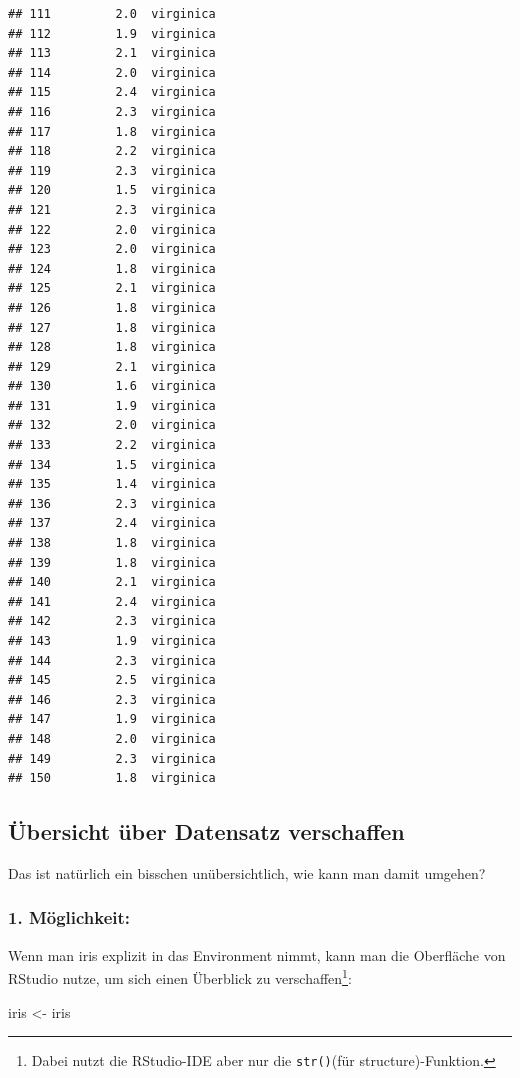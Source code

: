 \documentclass[
]{book}
\newenvironment{Shaded}{\begin{snugshade}}{\end{snugshade}}
\newcommand{\NormalTok}[1]{#1}
\newcommand{\OtherTok}[1]{\textcolor[rgb]{0.56,0.35,0.01}{#1}}
\begin{document}
\begin{verbatim}
## 111         2.0  virginica
## 112         1.9  virginica
## 113         2.1  virginica
## 114         2.0  virginica
## 115         2.4  virginica
## 116         2.3  virginica
## 117         1.8  virginica
## 118         2.2  virginica
## 119         2.3  virginica
## 120         1.5  virginica
## 121         2.3  virginica
## 122         2.0  virginica
## 123         2.0  virginica
## 124         1.8  virginica
## 125         2.1  virginica
## 126         1.8  virginica
## 127         1.8  virginica
## 128         1.8  virginica
## 129         2.1  virginica
## 130         1.6  virginica
## 131         1.9  virginica
## 132         2.0  virginica
## 133         2.2  virginica
## 134         1.5  virginica
## 135         1.4  virginica
## 136         2.3  virginica
## 137         2.4  virginica
## 138         1.8  virginica
## 139         1.8  virginica
## 140         2.1  virginica
## 141         2.4  virginica
## 142         2.3  virginica
## 143         1.9  virginica
## 144         2.3  virginica
## 145         2.5  virginica
## 146         2.3  virginica
## 147         1.9  virginica
## 148         2.0  virginica
## 149         2.3  virginica
## 150         1.8  virginica
\end{verbatim}

\hypertarget{uxfcbersicht-uxfcber-datensatz-verschaffen}{%
\subsection{Übersicht über Datensatz verschaffen}\label{uxfcbersicht-uxfcber-datensatz-verschaffen}}

Das ist natürlich ein bisschen unübersichtlich, wie kann man damit umgehen?

\hypertarget{muxf6glichkeit}{%
\subsubsection{1. Möglichkeit:}\label{muxf6glichkeit}}

Wenn man iris explizit in das Environment nimmt, kann man die Oberfläche von RStudio nutze, um sich einen Überblick zu verschaffen\footnote{Dabei nutzt die RStudio-IDE aber nur die \texttt{str()}(für structure)-Funktion.}:

\begin{Shaded}
\begin{Highlighting}[]
\NormalTok{iris }\OtherTok{\textless{}{-}}\NormalTok{ iris}
\end{Highlighting}
\end{Shaded}
\end{document}
